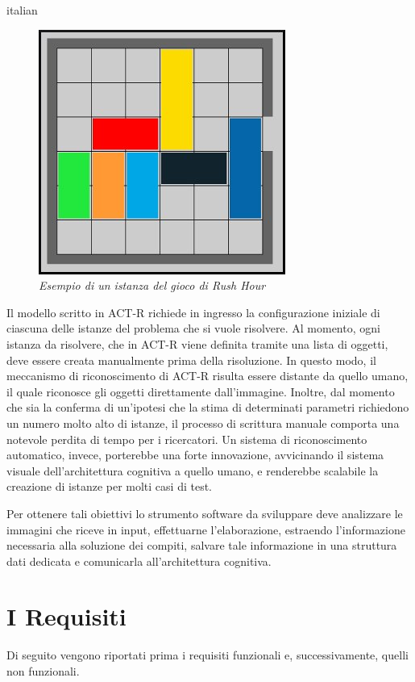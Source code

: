 \begin{otherlanguage*}{italian}
		\begin{figure}[!h]
		  \begin{center} 
			 \includegraphics[scale=0.6]{images/ch_03/originale.jpg}	
		  \end{center} 
		  \caption{\textit{Esempio di un istanza del gioco di Rush Hour}}
		  \label{fig:RushHourHumanIta}	
	  	\end{figure}

		Il modello scritto in \mbox{ACT-R} richiede in ingresso la configurazione iniziale di ciascuna delle istanze del problema che si vuole risolvere.
		Al momento, ogni istanza da risolvere, che in \mbox{ACT-R} viene definita tramite una lista di oggetti, deve essere creata manualmente prima della risoluzione. 
		In questo modo, il meccanismo di riconoscimento di \mbox{ACT-R} risulta essere distante da quello umano, il quale riconosce gli oggetti direttamente dall'immagine. 
		Inoltre, dal momento che sia la conferma di un'ipotesi che la stima di determinati parametri richiedono un numero molto alto di istanze, il processo di scrittura manuale comporta una notevole perdita di tempo per i ricercatori.
		Un sistema di riconoscimento automatico, invece, porterebbe una forte innovazione, avvicinando il sistema visuale dell'architettura cognitiva a quello umano, e renderebbe scalabile la creazione di istanze per molti casi di test.
		
		Per ottenere tali obiettivi lo strumento software da sviluppare deve analizzare le immagini che riceve in input, effettuarne l'elaborazione, estraendo l'informazione necessaria alla soluzione dei compiti, salvare tale informazione in una struttura dati dedicata e comunicarla all'architettura cognitiva.
		

	\section*{I Requisiti}
		Di seguito vengono riportati prima i requisiti funzionali e, successivamente, quelli non funzionali.
			

\end{otherlanguage*}
